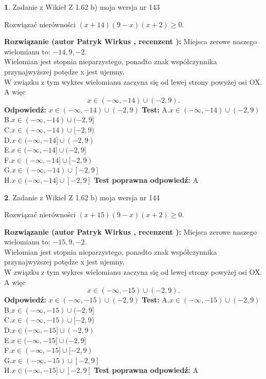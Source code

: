 \documentclass[12pt, a4paper]{article}
\theoremstyle{definition} %
\newtheorem{zad}{}
\newcommand{\zadStart}[1]{\begin{zad}#1\newline}
\newcommand{\zadStop}{\end{zad}}
\newcommand{\rozwStart}[2]{\noindent \textbf{Rozwiązanie (autor #1 , recenzent #2): }\newline}
\newcommand{\rozwStop}{\newline}
\newcommand{\odpStart}{\noindent \textbf{Odpowiedź:}\newline}
\newcommand{\odpStop}{\newline}
\newcommand{\testStart}{\noindent \textbf{Test:}\newline}
\newcommand{\testStop}{\newline}
\newcommand{\kluczStart}{\noindent \textbf{Test poprawna odpowiedź:}\newline}
\newcommand{\kluczStop}{\newline}
\begin{document}
\zadStart{Zadanie z Wikieł Z 1.62 b) moja wersja nr 143}

Rozwiązać nierówności $(x+14)(9-x)(x+2)\ge0$.
\zadStop
\rozwStart{Patryk Wirkus}{}
Miejsca zerowe naszego wielomianu to: $-14, 9, -2$.\\
Wielomian jest stopnia nieparzystego, ponadto znak współczynnika przy\linebreak najwyższej potędze x jest ujemny.\\ W związku z tym wykres wielomianu zaczyna się od lewej strony powyżej osi OX. A więc $$x \in (-\infty,-14) \cup (-2,9).$$
\rozwStop
\odpStart
$x \in (-\infty,-14) \cup (-2,9)$
\odpStop
\testStart
A.$x \in (-\infty,-14) \cup (-2,9)$\\
B.$x \in (-\infty,-14) \cup (-2,9]$\\
C.$x \in (-\infty,-14) \cup [-2,9)$\\
D.$x \in (-\infty,-14] \cup (-2,9)$\\
E.$x \in (-\infty,-14] \cup (-2,9]$\\
F.$x \in (-\infty,-14] \cup [-2,9)$\\
G.$x \in (-\infty,-14) \cup [-2,9]$\\
H.$x \in (-\infty,-14] \cup [-2,9]$
\testStop
\kluczStart
A
\kluczStop



\zadStart{Zadanie z Wikieł Z 1.62 b) moja wersja nr 144}

Rozwiązać nierówności $(x+15)(9-x)(x+2)\ge0$.
\zadStop
\rozwStart{Patryk Wirkus}{}
Miejsca zerowe naszego wielomianu to: $-15, 9, -2$.\\
Wielomian jest stopnia nieparzystego, ponadto znak współczynnika przy\linebreak najwyższej potędze x jest ujemny.\\ W związku z tym wykres wielomianu zaczyna się od lewej strony powyżej osi OX. A więc $$x \in (-\infty,-15) \cup (-2,9).$$
\rozwStop
\odpStart
$x \in (-\infty,-15) \cup (-2,9)$
\odpStop
\testStart
A.$x \in (-\infty,-15) \cup (-2,9)$\\
B.$x \in (-\infty,-15) \cup (-2,9]$\\
C.$x \in (-\infty,-15) \cup [-2,9)$\\
D.$x \in (-\infty,-15] \cup (-2,9)$\\
E.$x \in (-\infty,-15] \cup (-2,9]$\\
F.$x \in (-\infty,-15] \cup [-2,9)$\\
G.$x \in (-\infty,-15) \cup [-2,9]$\\
H.$x \in (-\infty,-15] \cup [-2,9]$
\testStop
\kluczStart
A
\kluczStop
\end{document}

